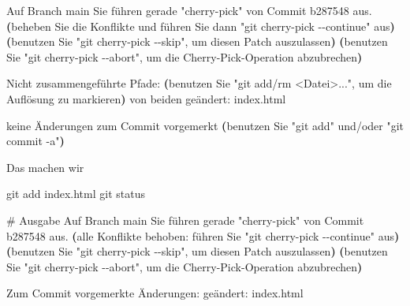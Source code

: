 \documentclass[
  ngerman,
  letterpaper,
  DIV=11]{scrreprt}
\newenvironment{Shaded}{\begin{snugshade}}{\end{snugshade}}
\newcommand{\CommentTok}[1]{\textcolor[rgb]{0.37,0.37,0.37}{#1}}
\newcommand{\ExtensionTok}[1]{\textcolor[rgb]{0.00,0.23,0.31}{#1}}
\newcommand{\FunctionTok}[1]{\textcolor[rgb]{0.28,0.35,0.67}{#1}}
\newcommand{\KeywordTok}[1]{\textcolor[rgb]{0.00,0.23,0.31}{\textbf{#1}}}
\newcommand{\NormalTok}[1]{\textcolor[rgb]{0.00,0.23,0.31}{#1}}
\newcommand{\StringTok}[1]{\textcolor[rgb]{0.13,0.47,0.30}{#1}}
\begin{document}
\begin{Shaded}
\begin{Highlighting}[]
\ExtensionTok{Auf}\NormalTok{ Branch main}
\ExtensionTok{Sie}\NormalTok{ führen gerade }\StringTok{"cherry{-}pick"}\NormalTok{ von Commit b287548 aus.}
  \KeywordTok{(}\ExtensionTok{beheben}\NormalTok{ Sie die Konflikte und führen Sie dann }
  \StringTok{"git cherry{-}pick {-}{-}continue"}\NormalTok{ aus}\KeywordTok{)}
  \KeywordTok{(}\ExtensionTok{benutzen}\NormalTok{ Sie }\StringTok{"git cherry{-}pick {-}{-}skip"}\NormalTok{, um diesen Patch }
  \ExtensionTok{auszulassen}\KeywordTok{)}
  \KeywordTok{(}\ExtensionTok{benutzen}\NormalTok{ Sie }\StringTok{"git cherry{-}pick {-}{-}abort"}\NormalTok{, um die }
  \ExtensionTok{Cherry{-}Pick{-}Operation}\NormalTok{ abzubrechen}\KeywordTok{)}

\ExtensionTok{Nicht}\NormalTok{ zusammengeführte Pfade:}
  \KeywordTok{(}\ExtensionTok{benutzen}\NormalTok{ Sie }\StringTok{"git add/rm \textless{}Datei\textgreater{}..."}\NormalTok{, um die Auflösung }
  \ExtensionTok{zu}\NormalTok{ markieren}\KeywordTok{)}
    \ExtensionTok{von}\NormalTok{ beiden geändert:    index.html}

\ExtensionTok{keine}\NormalTok{ Änderungen zum Commit vorgemerkt }
\KeywordTok{(}\ExtensionTok{benutzen}\NormalTok{ Sie }\StringTok{"git add"}\NormalTok{ und/oder }\StringTok{"git commit {-}a"}\KeywordTok{)}
\end{Highlighting}
\end{Shaded}

Das machen wir

\begin{Shaded}
\begin{Highlighting}[]
\FunctionTok{git}\NormalTok{ add index.html}
\FunctionTok{git}\NormalTok{ status}

\CommentTok{\# Ausgabe}
\ExtensionTok{Auf}\NormalTok{ Branch main}
\ExtensionTok{Sie}\NormalTok{ führen gerade }\StringTok{"cherry{-}pick"}\NormalTok{ von Commit b287548 aus.}
  \KeywordTok{(}\ExtensionTok{alle}\NormalTok{ Konflikte behoben: führen Sie }\StringTok{"git cherry{-}pick {-}{-}continue"} 
  \ExtensionTok{aus}\KeywordTok{)}
  \KeywordTok{(}\ExtensionTok{benutzen}\NormalTok{ Sie }\StringTok{"git cherry{-}pick {-}{-}skip"}\NormalTok{, um diesen Patch }
  \ExtensionTok{auszulassen}\KeywordTok{)}
  \KeywordTok{(}\ExtensionTok{benutzen}\NormalTok{ Sie }\StringTok{"git cherry{-}pick {-}{-}abort"}\NormalTok{, um die }
  \ExtensionTok{Cherry{-}Pick{-}Operation}\NormalTok{ abzubrechen}\KeywordTok{)}

\ExtensionTok{Zum}\NormalTok{ Commit vorgemerkte Änderungen:}
    \ExtensionTok{geändert:}\NormalTok{       index.html}
\end{Highlighting}
\end{Shaded}
\end{document}
